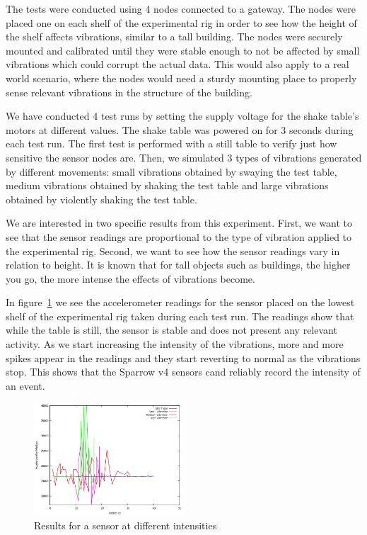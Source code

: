 The tests were conducted using 4 nodes connected to a gateway. The nodes were placed one on each shelf of the experimental rig in order to see how the height of the shelf affects vibrations, 
similar to a tall building. The nodes were securely mounted and calibrated until they were stable enough to not be affected by small vibrations which could corrupt the actual data. 
This would also apply to a real world scenario, where the nodes would need a sturdy mounting place to properly sense relevant vibrations in the structure of the building.

We have conducted 4 test runs by setting the supply voltage for the shake table's motors at different values. The shake table was powered on for 3 seconds during each test run. The first test is performed with a still table to verify just how sensitive the sensor nodes are. Then, we simulated 3 types of vibrations generated by different movements: small vibrations obtained by swaying the test table, medium vibrations obtained by shaking the test table and large vibrations obtained by 
violently shaking the test table.

We are interested in two specific results from this experiment. First, we want to see that the sensor readings are proportional to the type of vibration applied to 
the experimental rig. Second, we want to see how the sensor readings vary in relation to height. It is known that for tall objects such as buildings, the higher you 
go, the more intense the effects of vibrations become.

In figure~\ref{fig:same-sensor} we see the accelerometer readings for the sensor placed on the lowest shelf of the experimental rig taken during each test run. The
readings show that while the table is still, the sensor is stable and does not present any relevant activity. As we start increasing the intensity of the vibrations,
more and more spikes appear in the readings and they start reverting to normal as the vibrations stop. This shows that the Sparrow v4 sensors cand reliably record 
the intensity of an event.

\begin{figure}[ht] \centering
  \includegraphics[width=0.5\textwidth]{img/same-sensor.png}
  \caption{Results for a sensor at different intensities}
  \label{fig:same-sensor}
\end{figure}

